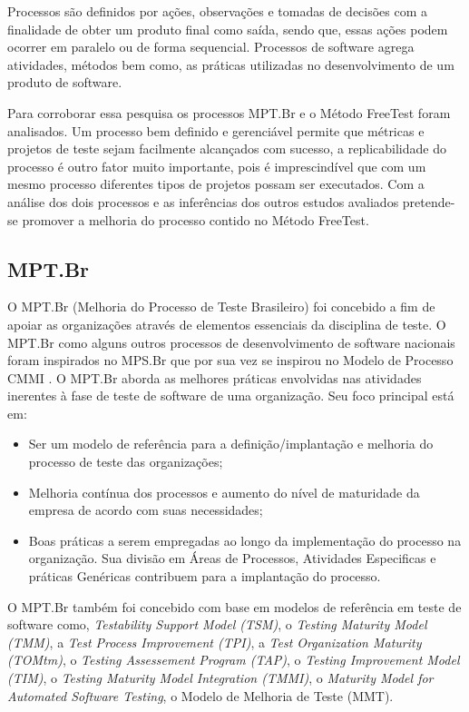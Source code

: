 Processos são definidos por ações, observações e tomadas de decisões com a finalidade de obter um produto final como saída, sendo que, essas ações podem ocorrer em paralelo ou de forma sequencial. Processos de software agrega atividades, métodos bem como, as práticas utilizadas no desenvolvimento de um produto de software.

Para corroborar essa pesquisa os processos MPT.Br \cite{GuiaMPTbr} e o Método FreeTest \cite{Camilo-junior2012} foram analisados. Um processo bem definido e gerenciável permite que métricas e projetos de teste sejam facilmente alcançados com sucesso, a replicabilidade do processo é outro fator muito importante, pois é imprescindível que com um mesmo processo diferentes tipos de projetos possam ser executados. Com a análise dos dois processos e as inferências dos outros estudos avaliados pretende-se promover a melhoria do processo contido no Método FreeTest.

\subsection{MPT.Br}

O MPT.Br (Melhoria do Processo de Teste Brasileiro) \cite{GuiaMPTbr} foi concebido a fim de apoiar as organizações através de elementos essenciais da disciplina de teste. O MPT.Br como alguns outros processos de desenvolvimento de software nacionais foram inspirados no MPS.Br \cite{Softex} que por sua vez se inspirou no Modelo de Processo CMMI \cite{cmmi}. O MPT.Br aborda as melhores práticas envolvidas nas atividades inerentes à fase de teste de software de uma organização. Seu foco principal está em:

\begin{itemize}
    \item Ser um modelo de referência para a definição/implantação e melhoria do processo de teste das organizações;
    \item Melhoria contínua dos processos e aumento do nível de maturidade da empresa de acordo com suas necessidades;
    \item Boas práticas a serem empregadas ao longo da implementação do processo na organização. Sua divisão em Áreas de Processos, Atividades Especificas e práticas Genéricas contribuem para a implantação do processo.
\end{itemize}

O MPT.Br também foi concebido com base em modelos de referência em teste de software como, \textit{Testability Support Model (TSM)}, o \textit{Testing Maturity Model (TMM)}, a \textit{Test Process Improvement (TPI)}, a \textit{Test Organization Maturity (TOMtm)}, o \textit{Testing Assessement Program (TAP)}, o \textit{Testing Improvement Model (TIM)}, o \textit{Testing Maturity Model Integration (TMMI)}, o \textit{Maturity Model for Automated Software Testing}, o Modelo de Melhoria de Teste (MMT).

